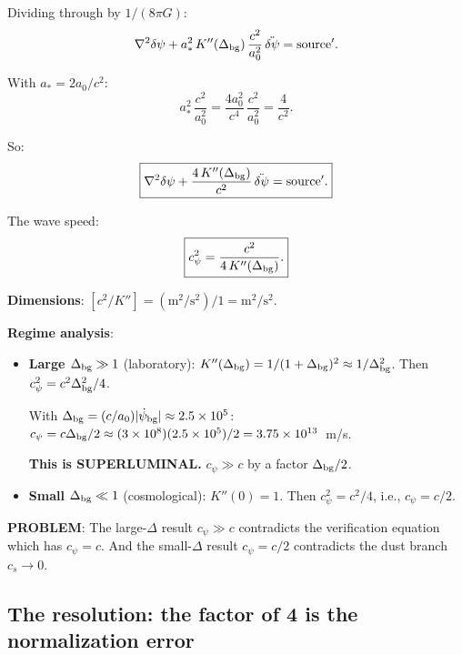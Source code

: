 \documentclass[11pt]{article}
\newcommand{\ee}[1]{\times 10^{#1}}
\newcommand{\dpsi}{\delta\psi}
\theoremstyle{definition}
\theoremstyle{remark}
\begin{document}
Dividing through by $1/(8\pi G)$:
\begin{equation}
\nabla^2\dpsi + a_*^2\,K''(\Delta_{\rm bg})\,\frac{c^2}{a_0^2}\,
\ddot{\dpsi} = \text{source}'.
\end{equation}

With $a_* = 2a_0/c^2$:
\begin{equation}
a_*^2\,\frac{c^2}{a_0^2} = \frac{4a_0^2}{c^4}\,\frac{c^2}{a_0^2}
= \frac{4}{c^2}.
\end{equation}

So:
\begin{equation}
\boxed{
\nabla^2\dpsi + \frac{4\,K''(\Delta_{\rm bg})}{c^2}\,\ddot{\dpsi}
= \text{source}'.
}
\label{eq:correct-wave-eqn}
\end{equation}

The wave speed:
\begin{equation}
\boxed{
c_\psi^2 = \frac{c^2}{4\,K''(\Delta_{\rm bg})}.
}
\label{eq:cpsi-correct}
\end{equation}

\textbf{Dimensions}: $[c^2/K''] = (\text{m}^2/\text{s}^2)/1
= \text{m}^2/\text{s}^2$. \checkmark

\textbf{Regime analysis}:

\begin{itemize}
\item \textbf{Large $\Delta_{\rm bg} \gg 1$} (laboratory):
  $K''(\Delta_{\rm bg}) = 1/(1+\Delta_{\rm bg})^2 \approx 1/\Delta_{\rm bg}^2$.
  Then $c_\psi^2 = c^2\Delta_{\rm bg}^2/4$.

  With $\Delta_{\rm bg} = (c/a_0)|\dot\psi_{\rm bg}| \approx 2.5\ee{5}$:
  $c_\psi = c\Delta_{\rm bg}/2 \approx (3\ee{8})(2.5\ee{5})/2
  = 3.75\ee{13}$~m/s.

  \textbf{This is SUPERLUMINAL.} $c_\psi \gg c$ by a factor $\Delta_{\rm bg}/2$.

\item \textbf{Small $\Delta_{\rm bg} \ll 1$} (cosmological):
  $K''(0) = 1$. Then $c_\psi^2 = c^2/4$, i.e., $c_\psi = c/2$.
\end{itemize}

\textbf{PROBLEM}: The large-$\Delta$ result $c_\psi \gg c$ contradicts
the verification equation which has $c_\psi = c$. And the small-$\Delta$
result $c_\psi = c/2$ contradicts the dust branch $c_s \to 0$.

\subsection{The resolution: the factor of 4 is the normalization error}
\end{document}
